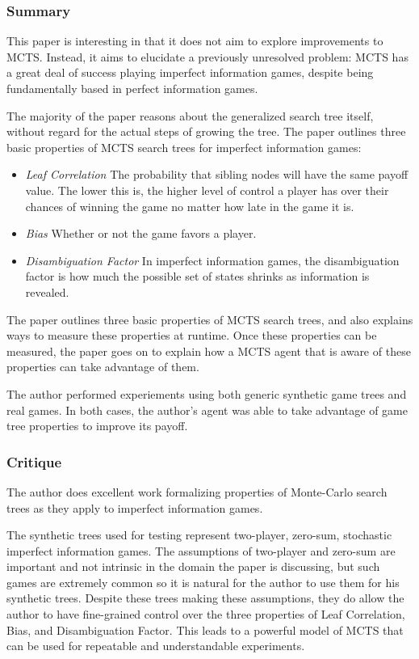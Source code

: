 \documentclass[letterpaper]{article}
\begin{document}
\subsubsection{Summary}
This paper \cite{long2010understanding} is interesting in that it does not aim to explore improvements to MCTS. Instead, it aims to elucidate a previously unresolved problem: MCTS has a great deal of success playing imperfect information games, despite being fundamentally based in perfect information games.

The majority of the paper reasons about the generalized search tree itself, without regard for the actual steps of growing the tree. The paper outlines three basic properties of MCTS search trees for imperfect information games:
\begin{itemize}
\item \emph{Leaf Correlation} The probability that sibling nodes will have the same payoff value. The lower this is, the higher level of control a player has over their chances of winning the game no matter how late in the game it is.
\item \emph{Bias} Whether or not the game favors a player.
\item \emph{Disambiguation Factor} In imperfect information games, the disambiguation factor is how much the possible set of states shrinks as information is revealed.
\end{itemize}

The paper outlines three basic properties of MCTS search trees, and also explains ways to measure these properties at runtime. Once these properties can be measured, the paper goes on to explain how a MCTS agent that is aware of these properties can take advantage of them.

The author performed experiements using both generic synthetic game trees and real games. In both cases, the author's agent was able to take advantage of game tree properties to improve its payoff.

\subsubsection{Critique}

The author does excellent work formalizing properties of Monte-Carlo search trees as they apply to imperfect information games.

The synthetic trees used for testing represent two-player, zero-sum, stochastic imperfect information games. The assumptions of two-player and zero-sum are important and not intrinsic in the domain the paper is discussing, but such games are extremely common so it is natural for the author to use them for his synthetic trees. Despite these trees making these assumptions, they do allow the author to have fine-grained control over the three properties of Leaf Correlation, Bias, and Disambiguation Factor. This leads to a powerful model of MCTS that can be used for repeatable and understandable experiments.
\end{document}
